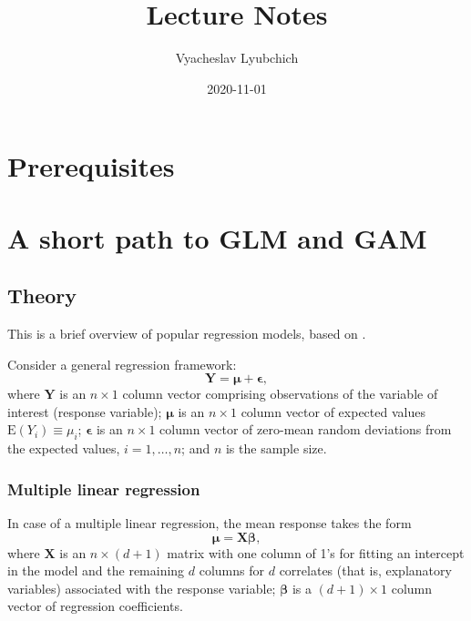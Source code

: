 \documentclass[
]{book}
\title{Lecture Notes}
\author{Vyacheslav Lyubchich}
\date{2020-11-01}
\begin{document}
\maketitle

{
\setcounter{tocdepth}{1}
\tableofcontents
}
\hypertarget{prerequisites}{%
\chapter*{Prerequisites}\label{prerequisites}}

\hypertarget{GLM}{%
\chapter{A short path to GLM and GAM}\label{GLM}}

\hypertarget{theory}{%
\section{Theory}\label{theory}}

This is a brief overview of popular regression models, based on \citet{Lyubchich:etal:2019:wires}.

Consider a general regression framework:
\begin{equation}
    \label{eq:general}
    \mathbf{Y} = \boldsymbol{\mu} + \boldsymbol{\epsilon},
\end{equation}
where \(\mathbf{Y}\) is an \(n\times1\) column vector comprising observations of the variable of interest (response variable); \(\boldsymbol{\mu}\) is an \(n\times1\) column vector of expected values \(\mathrm{E}(Y_i) \equiv \mu_i\); \(\boldsymbol{\epsilon}\) is an \(n\times1\) column vector of zero-mean random deviations from the expected values, \(i = 1,\ldots,n\); and \(n\) is the sample size.

\hypertarget{multiple-linear-regression}{%
\subsection{Multiple linear regression}\label{multiple-linear-regression}}

In case of a multiple linear regression, the mean response takes the form
\begin{equation}
    \label{eq:mlr}
    \boldsymbol{\mu} = \mathbf{X}\boldsymbol{\beta},
\end{equation}
where \(\mathbf{X}\) is an \(n\times(d+1)\) matrix with one column of 1's for fitting an intercept in the model and the remaining \(d\) columns for \(d\) correlates (that is, explanatory variables) associated with the response variable; \(\boldsymbol{\beta}\) is a \((d+1)\times 1\) column vector of regression coefficients.
\end{document}
